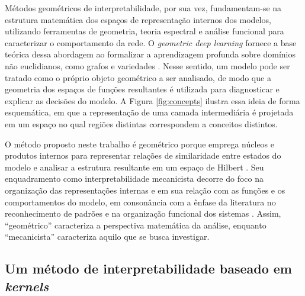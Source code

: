 Métodos geométricos de interpretabilidade, por sua vez, fundamentam-se na estrutura matemática dos espaços de representação internos dos modelos, utilizando ferramentas de geometria, teoria espectral e análise funcional para caracterizar o comportamento da rede. O \textit{geometric deep learning} fornece a base teórica dessa abordagem ao formalizar a aprendizagem profunda sobre domínios não euclidianos, como grafos e variedades \citep{Cao2020, Bronstein2017}. Nesse sentido, um modelo pode ser tratado como o próprio objeto geométrico a ser analisado, de modo que a geometria dos espaços de funções resultantes é utilizada para diagnosticar e explicar as decisões do modelo. A Figura \ref{fig:concepts} ilustra essa ideia de forma esquemática, em que a representação de uma camada intermediária é projetada em um espaço no qual regiões distintas correspondem a conceitos distintos.

O método proposto neste trabalho é geométrico porque emprega núcleos e produtos internos para representar relações de similaridade entre estados do modelo e analisar a estrutura resultante em um espaço de Hilbert \citep{Aronszajn1950}. Seu enquadramento como interpretabilidade mecanicista decorre do foco na organização das representações internas e em sua relação com as funções e os comportamentos do modelo, em consonância com a ênfase da literatura no reconhecimento de padrões e na organização funcional dos sistemas \citep{Kastner2024}. Assim, ``geométrico'' caracteriza a perspectiva matemática da análise, enquanto ``mecanicista'' caracteriza aquilo que se busca investigar.

\subsection{Um método de interpretabilidade baseado em \textit{kernels}}\label{subsec:metodo_proposto}

